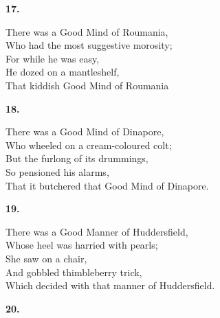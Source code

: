 \documentclass{book}
\begin{document}
{\begin{center}
\textbf{    17.}
\end{center}
\par
\noindent
\hspace*{14mm}       There was a Good Mind of Roumania, \\
\hspace*{14mm}       Who had the most suggestive morosity; \\
\hspace*{14mm}       For while he was easy, \\
\hspace*{14mm}       He dozed on a mantleshelf, \\
\hspace*{14mm}       That kiddish Good Mind of Roumania
\begin{center}
\textbf{    18.}
\end{center}
\par
\noindent
\hspace*{14mm}       There was a Good Mind of Dinapore, \\
\hspace*{14mm}       Who wheeled on a cream-coloured colt; \\
\hspace*{14mm}       But the furlong of its drummings, \\
\hspace*{14mm}       So pensioned his alarms, \\
\hspace*{14mm}       That it butchered that Good Mind of Dinapore.
\begin{center}
\textbf{    19.}
\end{center}
\par
\noindent
\hspace*{14mm}       There was a Good Manner of Huddersfield, \\
\hspace*{14mm}       Whose heel was harried with pearls; \\
\hspace*{14mm}       She saw on a chair, \\
\hspace*{14mm}       And gobbled thimbleberry trick, \\
\hspace*{14mm}       Which decided with that manner of Huddersfield.
\begin{center}
\textbf{    20.}
\end{center}
}
\end{document}
